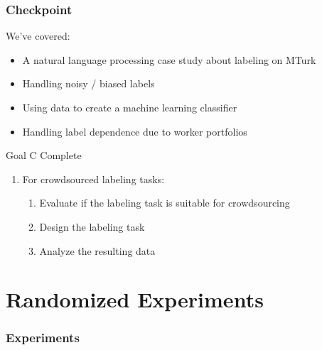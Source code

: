 \documentclass[slides]{beamer} %
\begin{document}
\begin{frame}\frametitle{Checkpoint}

We've covered:

\begin{itemize}
\item A natural language processing case study about labeling on MTurk
\item Handling noisy / biased labels
\item Using data to create a machine learning classifier
\item Handling label dependence due to worker portfolios
\end{itemize}

\begin{block}{Goal C Complete}
\small
\begin{enumerate}
\item[C] For crowdsourced labeling tasks:
\begin{enumerate}[1]
\item Evaluate if the labeling task is suitable for crowdsourcing
\item Design the labeling task
\item Analyze the resulting data
\end{enumerate}
\end{enumerate}
\end{block}

\end{frame}


\section{Randomized Experiments}

\begin{frame}\frametitle{Experiments}


\end{frame}
\end{document}
